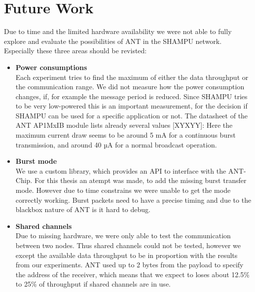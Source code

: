 \section{Future Work}
\label{sec:future}
Due to time and the limited hardware availability we were not able to fully explore and evaluate the possibilities of ANT in the SHAMPU network. Especially these three areas should be revisted:

\begin{itemize}
	\item{\textbf{Power consumptions}} \hfill \\ Each experiment tries to find the maximum of either the data throughput or the communication range. We did not measure how the power consumption changes, if, for example the message period is reduced. Since SHAMPU tries to be very low-powered this is an important measurement, for the decision if SHAMPU can be used for a specific application or not. The datasheet of the ANT AP1MxIB module lists already several values [XYXYY]: Here the maximum current draw seems to be around 5 mA for a continuous burst transmission, and around 40 µA for a normal broadcast operation.
	\item{\textbf{Burst mode}} \hfill \\ We use a custom library, which provides an API to interface with the ANT-Chip. For this thesis an atempt was made, to add the missing burst transfer mode. However due to time constrains we were unable to get the mode correctly working. Burst packets need to have a precise timing and due to the blackbox nature of ANT is it hard to debug.
	\item{\textbf{Shared channels}} \hfill \\ Due to missing hardware, we were only able to test the communication between two nodes. Thus shared channels could not be tested, however we except the available data throughput to be in proportion with the results from our experiments. ANT used up to 2 bytes from the payload to specify the address of the receiver, which means that we expect to loses about 12.5\% to 25\% of throughput if shared channels are in use.
\end{itemize}